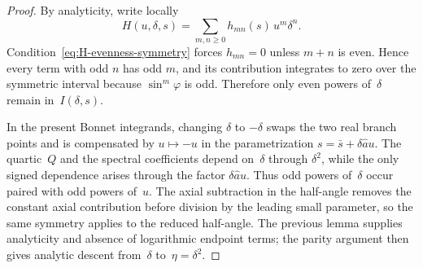 \documentclass[11pt,a4paper]{article}
\theoremstyle{plain}
\theoremstyle{definition}
\theoremstyle{remark}
\begin{document}
\begin{proof}
  By analyticity, write locally
  \[
    H(u,\delta,s)=\sum_{m,n\ge0} h_{mn}(s)\,u^m\delta^n .
  \]
  Condition~\eqref{eq:H-evenness-symmetry} forces $h_{mn}=0$ unless
  $m+n$ is even.  Hence every term with odd $n$ has odd $m$, and its
  contribution integrates to zero over the symmetric interval because
  $\sin^m\varphi$ is odd.  Therefore only even powers of~$\delta$
  remain in~$I(\delta,s)$.

  In the present Bonnet integrands, changing $\delta$ to $-\delta$
  swaps the two real branch points and is compensated by
  $u\mapsto -u$ in the parametrization
  $s=\bar s+\delta\widehat a u$.  The quartic~$Q$ and the spectral
  coefficients depend on~$\delta$ through $\delta^2$, while the only
  signed dependence arises through the factor
  $\delta\widehat a u$.  Thus odd powers of~$\delta$ occur paired with
  odd powers of~$u$.  The axial subtraction in the half-angle removes
  the constant axial contribution before division by the leading
  small parameter, so the same symmetry applies to the reduced
  half-angle.  The previous lemma supplies analyticity and absence of
  logarithmic endpoint terms; the parity argument then gives analytic
  descent from~$\delta$ to~$\eta=\delta^2$.
\end{proof}
\end{document}
